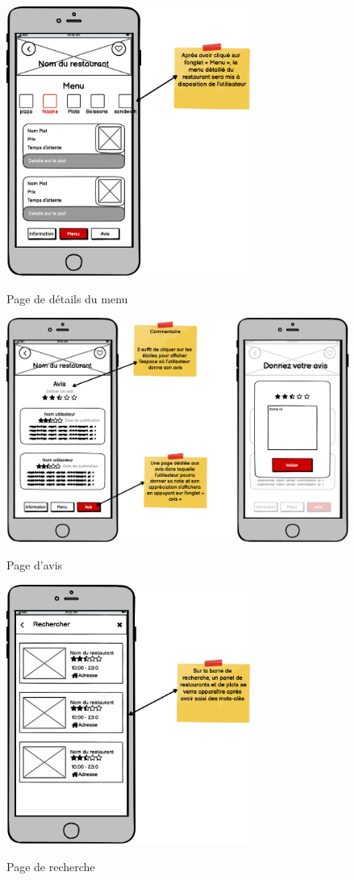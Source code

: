 \begin{figure}[!h]
    \centering
    \includegraphics[width=8cm]{images/Chapitre3/maquettes_balsamiq/page_menu .png}
    \label{fig:pagemenu}
    \caption{Page de détails du menu}
\end{figure} 
\newpage
\begin{figure}[!h]
    \centering
    \includegraphics[width=14cm]{images/Chapitre3/maquettes_balsamiq/page_avis.png}
    \label{fig:pageavis}
    \caption{Page d'avis}
\end{figure} 
\begin{figure}[!h]
    \centering
    \includegraphics[width=8cm]{images/Chapitre3/maquettes_balsamiq/Page_de_recherche.png}
    \label{fig:pagerecherche}
    \caption{Page de recherche}
\end{figure} 
